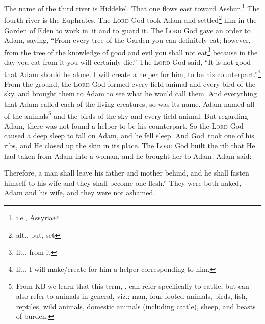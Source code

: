 \begin{inparaenum}
     The name of the third river is Hiddekel. That one flows east toward Asshur.\footnote{i.e., Assyria} The fourth river is the Euphrates.%
     The \textsc{Lord} God took Adam and settled\footnote{alt., put, set} him in the Garden of Eden to work in\understood\ it and to guard it.%
     The \textsc{Lord} God gave an order to Adam, saying, ``From every tree of the Garden you can definitely eat;%
     however, from the tree of the knowledge of good and evil you shall not eat\footnote{lit., from it} because in the day you eat from it you will certainly die.''%
     The \textsc{Lord} God said, ``It is not good that Adam should be alone. I will create a helper for him, to be his counterpart.''\footnote{lit., I will make/create for him a helper corresponding to him.}%
     From the ground, the \textsc{Lord} God formed every field animal and every bird of the sky, and brought them to Adam to see what he would call them. And everything that Adam called each of the living creatures, so was its name.%
     Adam named all of the animals\footnote{From KB we learn that this term, , can refer specifically to cattle, but can also refer to animals in general, viz.: man, four-footed animals, birds, fish, reptiles, wild animals, domestic animals (including cattle), sheep, and beasts of burden.} and the birds of the sky and every field animal. But regarding Adam, there was not found a helper to be his counterpart.%
     So the \textsc{Lord} God caused a deep sleep to fall on Adam, and he fell sleep. And God\understood\ took one of his ribs, and He closed up the skin in its place.%
     The \textsc{Lord} God built the rib that He had taken from Adam into a woman, and he brought her to Adam.%
     Adam said:%
    
    
    
     Therefore, a man shall leave his father and mother behind, and he shall fasten himself to his wife and they shall become one flesh.''%
     They were both naked, Adam and his wife, and they were not ashamed.%
\end{inparaenum}
